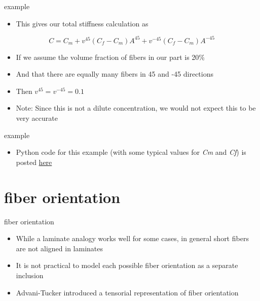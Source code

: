 \documentclass[
  letterpaper,
  ignorenonframetext,
  aspectratio=43,
  handout,
  12pt]{beamer}
\providecommand{\tightlist}{%
  \setlength{\itemsep}{0pt}\setlength{\parskip}{0pt}}
\providecommand{\tightlist}{%
\setlength{\itemsep}{0pt}\setlength{\parskip}{0pt}}
\begin{document}
\begin{frame}{example}
\protect\hypertarget{example-3}{}
\begin{itemize}
\tightlist
\item
  This gives our total stiffness calculation as
\end{itemize}

\[C = C_m + v^{45}(C_f-C_m)A^{45} + v^{-45}(C_f-C_m)A^{-45}\]

\begin{itemize}
\tightlist
\item
  If we assume the volume fraction of fibers in our part is 20\%
\item
  And that there are equally many fibers in 45 and -45 directions
\item
  Then \(v^{45} = v^{-45} = 0.1\)
\item
  Note: Since this is not a dilute concentration, we would not expect
  this to be very accurate
\end{itemize}
\end{frame}

\begin{frame}{example}
\protect\hypertarget{example-4}{}
\begin{itemize}
\tightlist
\item
  Python code for this example (with some typical values for
  \emph{C}\emph{m} and \emph{C}\emph{f}) is posted
  \href{http://nbviewer.jupyter.org/github/ndaman/multiscale/blob/master/examples/Eshelby.ipynb}{here}
\end{itemize}
\end{frame}

\hypertarget{fiber-orientation-1}{%
\section{fiber orientation}\label{fiber-orientation-1}}

\begin{frame}{fiber orientation}
\protect\hypertarget{fiber-orientation-2}{}
\begin{itemize}
\tightlist
\item
  While a laminate analogy works well for some cases, in general short
  fibers are not aligned in laminates
\item
  It is not practical to model each possible fiber orientation as a
  separate inclusion
\item
  Advani-Tucker introduced a tensorial representation of fiber
  orientation
\end{itemize}
\end{frame}
\end{document}
